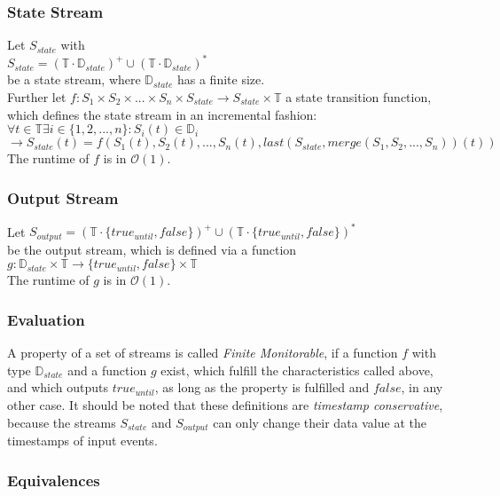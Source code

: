 		\subsubsection{State Stream}
			\label{monitorability_state}
			Let $S_{state}$ with\\
			$S_{state}= (\mathbb{T}\cdot \mathbb{D}_{state})^+\cup(\mathbb{T}\cdot \mathbb{D}_{state})^*$\\
			be a state stream, where $\mathbb{D}_{state}$ has a finite size.\\
			Further let $f: S_1 \times S_2 \times ... \times S_n \times S_{state}\rightarrow S_{state}\times \mathbb{T}$ a state transition function, which defines the state stream in an incremental fashion:\\
			$\forall t\in \mathbb T \exists i\in \{1,2,...,n\}: S_i(t)\in\mathbb D_i$\\
			$\rightarrow S_{state}(t)= f(S_1(t), S_2(t), ..., S_n(t), last(S_{state}, merge(S_1, S_2, ..., S_n))(t))$\\
			The runtime of $f$ is in $\mathcal{O}(1)$.
		\subsubsection{Output Stream}
			Let $S_{output}= (\mathbb{T}\cdot \{true_{until}, false\})^+\cup(\mathbb{T}\cdot \{true_{until}, false\})^*$\\
			be the output stream, which is defined via a function\\
			$g: \mathbb{D}_{state}\times \mathbb{T}\rightarrow \{true_{until}, false\}\times \mathbb{T}$\\
			The runtime of $g$ is in $\mathcal{O}(1)$.
		\subsubsection{Evaluation}
			A property of a set of streams is called \emph{Finite Monitorable}, if a function $f$ with type $\mathbb{D}_{state}$ and a function $g$ exist, which fulfill the characteristics called above, and which outputs $true_{until}$, as long as the property is fulfilled and $false$, in any other case. It should be noted that these definitions are \emph{timestamp conservative}, because the streams $S_{state}$ and $S_{output}$ can only change their data value at the timestamps of input events.
		\subsubsection{Equivalences}
			
